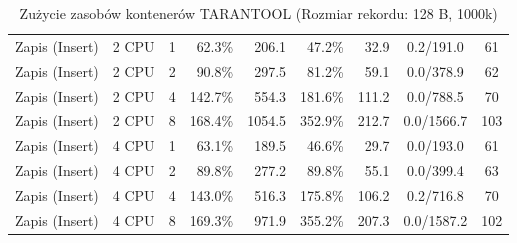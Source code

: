 \begin{table}[ht]
{\begin{tabular}{llcrrrrcc}
Zapis (Insert) & 2 CPU & 1 & 62.3\% & 206.1 & 47.2\% & 32.9 & 0.2/191.0 & 61 \\
Zapis (Insert) & 2 CPU & 2 & 90.8\% & 297.5 & 81.2\% & 59.1 & 0.0/378.9 & 62 \\
Zapis (Insert) & 2 CPU & 4 & 142.7\% & 554.3 & 181.6\% & 111.2 & 0.0/788.5 & 70 \\
Zapis (Insert) & 2 CPU & 8 & 168.4\% & 1054.5 & 352.9\% & 212.7 & 0.0/1566.7 & 103 \\
Zapis (Insert) & 4 CPU & 1 & 63.1\% & 189.5 & 46.6\% & 29.7 & 0.0/193.0 & 61 \\
Zapis (Insert) & 4 CPU & 2 & 89.8\% & 277.2 & 89.8\% & 55.1 & 0.0/399.4 & 63 \\
Zapis (Insert) & 4 CPU & 4 & 143.0\% & 516.3 & 175.8\% & 106.2 & 0.2/716.8 & 70 \\
Zapis (Insert) & 4 CPU & 8 & 169.3\% & 971.9 & 355.2\% & 207.3 & 0.0/1587.2 & 102 \\
\bottomrule
\end{tabular}%
}
\caption{Zużycie zasobów kontenerów TARANTOOL (Rozmiar rekordu: 128 B, 1000k)}
\label{tab:resources_tarantool_small_1000000}
\end{table}
